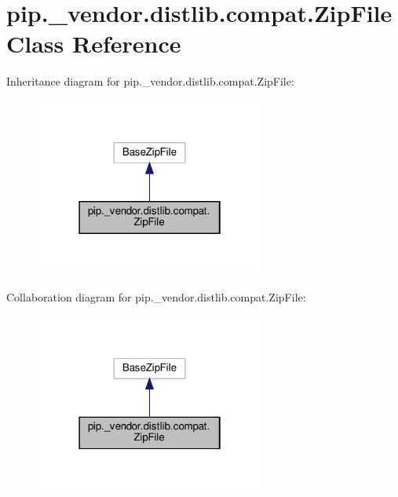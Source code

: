 \hypertarget{classpip_1_1__vendor_1_1distlib_1_1compat_1_1ZipFile}{}\section{pip.\+\_\+vendor.\+distlib.\+compat.\+Zip\+File Class Reference}
\label{classpip_1_1__vendor_1_1distlib_1_1compat_1_1ZipFile}


Inheritance diagram for pip.\+\_\+vendor.\+distlib.\+compat.\+Zip\+File\+:
\nopagebreak
\begin{figure}[H]
\begin{center}
\leavevmode
\includegraphics[width=214pt]{classpip_1_1__vendor_1_1distlib_1_1compat_1_1ZipFile__inherit__graph}
\end{center}
\end{figure}


Collaboration diagram for pip.\+\_\+vendor.\+distlib.\+compat.\+Zip\+File\+:
\nopagebreak
\begin{figure}[H]
\begin{center}
\leavevmode
\includegraphics[width=214pt]{classpip_1_1__vendor_1_1distlib_1_1compat_1_1ZipFile__coll__graph}
\end{center}
\end{figure}
